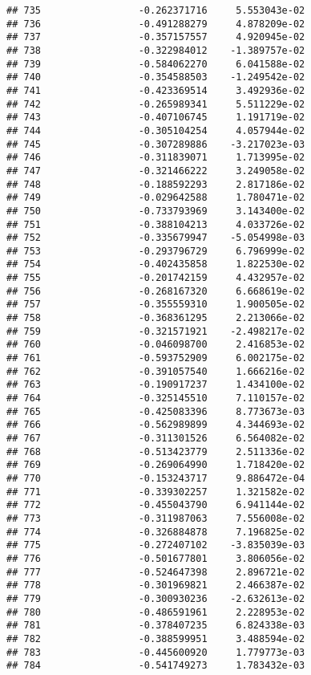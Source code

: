\documentclass[
]{article}
\begin{document}
\begin{verbatim}
## 735                 -0.262371716     5.553043e-02
## 736                 -0.491288279     4.878209e-02
## 737                 -0.357157557     4.920945e-02
## 738                 -0.322984012    -1.389757e-02
## 739                 -0.584062270     6.041588e-02
## 740                 -0.354588503    -1.249542e-02
## 741                 -0.423369514     3.492936e-02
## 742                 -0.265989341     5.511229e-02
## 743                 -0.407106745     1.191719e-02
## 744                 -0.305104254     4.057944e-02
## 745                 -0.307289886    -3.217023e-03
## 746                 -0.311839071     1.713995e-02
## 747                 -0.321466222     3.249058e-02
## 748                 -0.188592293     2.817186e-02
## 749                 -0.029642588     1.780471e-02
## 750                 -0.733793969     3.143400e-02
## 751                 -0.388104213     4.033726e-02
## 752                 -0.335679947    -5.054998e-03
## 753                 -0.293796729     6.796999e-02
## 754                 -0.402435858     1.822530e-02
## 755                 -0.201742159     4.432957e-02
## 756                 -0.268167320     6.668619e-02
## 757                 -0.355559310     1.900505e-02
## 758                 -0.368361295     2.213066e-02
## 759                 -0.321571921    -2.498217e-02
## 760                 -0.046098700     2.416853e-02
## 761                 -0.593752909     6.002175e-02
## 762                 -0.391057540     1.666216e-02
## 763                 -0.190917237     1.434100e-02
## 764                 -0.325145510     7.110157e-02
## 765                 -0.425083396     8.773673e-03
## 766                 -0.562989899     4.344693e-02
## 767                 -0.311301526     6.564082e-02
## 768                 -0.513423779     2.511336e-02
## 769                 -0.269064990     1.718420e-02
## 770                 -0.153243717     9.886472e-04
## 771                 -0.339302257     1.321582e-02
## 772                 -0.455043790     6.941144e-02
## 773                 -0.311987063     7.556008e-02
## 774                 -0.326884878     7.196825e-02
## 775                 -0.272407102    -3.835039e-03
## 776                 -0.501677801     3.806056e-02
## 777                 -0.524647398     2.896721e-02
## 778                 -0.301969821     2.466387e-02
## 779                 -0.300930236    -2.632613e-02
## 780                 -0.486591961     2.228953e-02
## 781                 -0.378407235     6.824338e-03
## 782                 -0.388599951     3.488594e-02
## 783                 -0.445600920     1.779773e-03
## 784                 -0.541749273     1.783432e-03

\end{verbatim}
\end{document}
